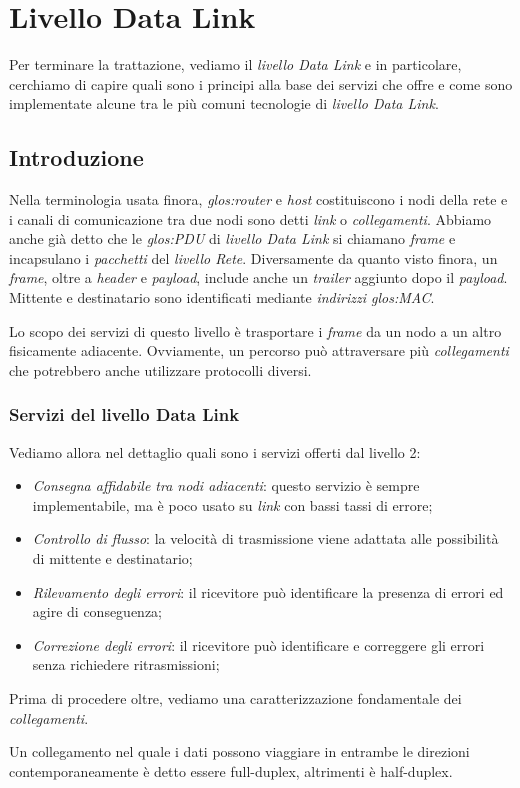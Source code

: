 \chapter{Livello Data Link}
Per terminare la trattazione, vediamo il \emph{livello Data Link} e in particolare,
cerchiamo di capire quali sono i principi alla base dei servizi che offre
e come sono implementate alcune tra le più comuni tecnologie di \emph{livello
Data Link}.

\section{Introduzione}
Nella terminologia usata finora, \emph{\gls{glos:router}} e \emph{host} costituiscono
i nodi della rete e i canali di comunicazione tra due nodi sono detti \emph{link}
o \emph{collegamenti}. Abbiamo anche già detto che le \emph{\gls{glos:PDU}} di
\emph{livello Data Link} si chiamano \emph{frame} e incapsulano i \emph{pacchetti}
del \emph{livello Rete}. Diversamente da quanto visto finora, un \emph{frame},
oltre a \emph{header} e \emph{payload}, include anche un \emph{trailer} aggiunto
dopo il \emph{payload}. Mittente e destinatario sono identificati mediante
\emph{indirizzi \emph{\gls{glos:MAC}}}.

Lo scopo dei servizi di questo livello è trasportare i \emph{frame} da un nodo
a un altro fisicamente adiacente. Ovviamente, un percorso può attraversare più
\emph{collegamenti} che potrebbero anche utilizzare protocolli diversi.

\subsection{Servizi del livello Data Link}
Vediamo allora nel dettaglio quali sono i servizi offerti dal livello 2:
\begin{itemize}
    \item \emph{Consegna affidabile tra nodi adiacenti}: questo servizio è
    sempre implementabile, ma è poco usato su \emph{link} con bassi tassi di errore;
    \item \emph{Controllo di flusso}: la velocità di trasmissione viene adattata
    alle possibilità di mittente e destinatario;
    \item \emph{Rilevamento degli errori}: il ricevitore può identificare la presenza
    di errori ed agire di conseguenza;
    \item \emph{Correzione degli errori}: il ricevitore può identificare e
    correggere gli errori senza richiedere ritrasmissioni;
\end{itemize}
\noindent
Prima di procedere oltre, vediamo una caratterizzazione fondamentale dei
\emph{collegamenti}.
\begin{definition}
    Un collegamento nel quale i dati possono viaggiare in entrambe le direzioni
    contemporaneamente è detto essere full-duplex, altrimenti è half-duplex.
\end{definition}

